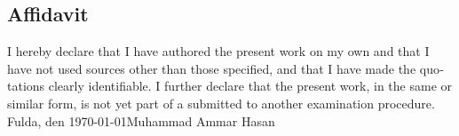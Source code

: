 \newpage
\begin{otherlanguage}{english}
\thispagestyle{empty}
\section*{Affidavit}
\thispagestyle{empty}
I hereby declare that I have authored the present work on my own and that I have not used sources other than those specified, and that I have made the quotations clearly identifiable.
\newline
I further declare that the present work, in the same or similar form, is not yet part of a submitted to another examination procedure.
\vspace{4\baselineskip}\\
Fulda, den \today \hfill Muhammad Ammar Hasan
\vspace{4\baselineskip}\\
\end{otherlanguage}